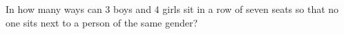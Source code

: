 In how many ways can $3$ boys and $4$ girls sit in a row of seven seats so that no one sits next to a person of the same gender?
